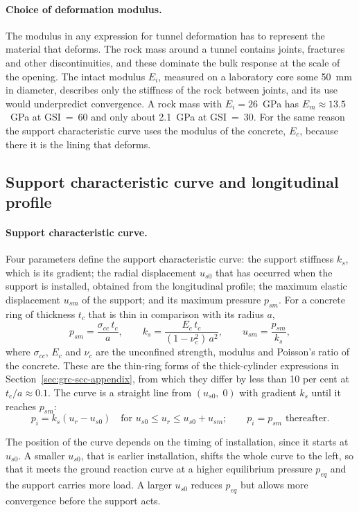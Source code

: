 \paragraph{Choice of deformation modulus.}
The modulus in any expression for tunnel deformation has to represent the
material that deforms. The rock mass around a tunnel contains joints,
fractures and other discontinuities, and these dominate the bulk response at
the scale of the opening. The intact modulus $E_i$, measured on a laboratory
core some 50~mm in diameter, describes only the stiffness of the rock
between joints, and its use would underpredict convergence. A rock mass with
$E_i = 26$~GPa has $E_m \approx 13.5$~GPa at GSI~=~60 and only about 2.1~GPa
at GSI~=~30. For the same reason the support characteristic curve uses the
modulus of the concrete, $E_c$, because there it is the lining that deforms.

\subsection{Support characteristic curve and longitudinal profile}
\label{sec:scc-and-ldp}

\paragraph{Support characteristic curve.}
Four parameters define the support characteristic curve: the support
stiffness $k_s$, which is its gradient; the radial displacement $u_{s0}$ that
has occurred when the support is installed, obtained from the longitudinal
profile; the maximum elastic displacement $u_{sm}$ of the support; and its
maximum pressure $p_{sm}$. For a concrete ring of thickness $t_c$ that is
thin in comparison with its radius $a$,
\[
p_{sm} = \frac{\sigma_{cc}\, t_c}{a}, \qquad
k_s = \frac{E_c\, t_c}{(1-\nu_c^2)\,a^2}, \qquad
u_{sm} = \frac{p_{sm}}{k_s} ,
\]
where $\sigma_{cc}$, $E_c$ and $\nu_c$ are the unconfined strength, modulus
and Poisson's ratio of the concrete. These are the thin-ring forms of the
thick-cylinder expressions in Section~\ref{sec:grc-scc-appendix}, from which
they differ by less than 10 per cent at $t_c/a \approx 0.1$. The curve is a
straight line from $(u_{s0},\; 0)$ with gradient $k_s$ until it reaches
$p_{sm}$:
\[
p_i = k_s (u_r - u_{s0}) \quad \text{for } u_{s0} \leq u_r \leq u_{s0}+u_{sm}; \qquad p_i = p_{sm} \text{ thereafter.}
\]

The position of the curve depends on the timing of installation, since it
starts at $u_{s0}$. A smaller $u_{s0}$, that is earlier installation, shifts
the whole curve to the left, so that it meets the ground reaction curve at a
higher equilibrium pressure $p_{eq}$ and the support carries more load. A
larger $u_{s0}$ reduces $p_{eq}$ but allows more convergence before the
support acts.

